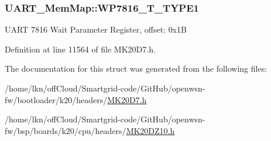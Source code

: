 \subsubsection[{\texorpdfstring{W\+P7816\+\_\+\+T\+\_\+\+T\+Y\+P\+E1}{WP7816_T_TYPE1}}]{ U\+A\+R\+T\+\_\+\+Mem\+Map\+::\+W\+P7816\+\_\+\+T\+\_\+\+T\+Y\+P\+E1}\hypertarget{struct_u_a_r_t___mem_map_ab72e460a52f5caee734e5c92471a3060}{}\label{struct_u_a_r_t___mem_map_ab72e460a52f5caee734e5c92471a3060}
U\+A\+RT 7816 Wait Parameter Register, offset\+: 0x1B 

Definition at line 11564 of file M\+K20\+D7.\+h.



The documentation for this struct was generated from the following files\+:\begin{DoxyCompactItemize}
\item 
/home/lkn/off\+Cloud/\+Smartgrid-\/code/\+Git\+Hub/openwsn-\/fw/bootloader/k20/headers/\hyperlink{bootloader_2k20_2headers_2_m_k20_d7_8h}{M\+K20\+D7.\+h}\item 
/home/lkn/off\+Cloud/\+Smartgrid-\/code/\+Git\+Hub/openwsn-\/fw/bsp/boards/k20/cpu/headers/\hyperlink{_m_k20_d_z10_8h}{M\+K20\+D\+Z10.\+h}\end{DoxyCompactItemize}
